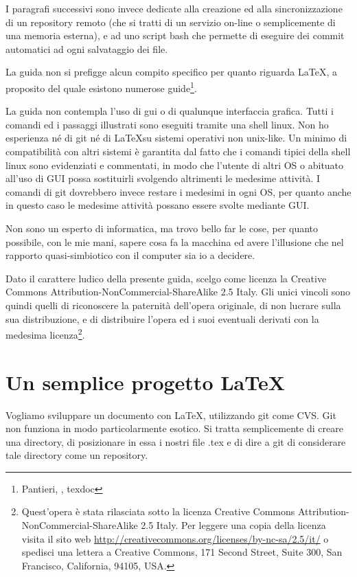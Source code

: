 \documentclass[a4paper,12pt,oneside]{article}
\begin{document}
I paragrafi successivi sono invece dedicate alla creazione ed alla
sincronizzazione di un repository remoto (che si tratti di un servizio on-line
o semplicemente di una memoria esterna), e ad uno script bash che permette di
eseguire dei commit automatici ad ogni salvataggio dei file.

La guida non si prefigge alcun compito specifico per quanto riguarda \LaTeX, a
proposito del quale esistono numerose guide\footnote{Pantieri, \guit,
texdoc}.

La guida non contempla l'uso di gui o di qualunque interfaccia grafica. Tutti i
comandi ed i passaggi illustrati sono eseguiti tramite una shell linux.
Non ho esperienza né di git né di \LaTeX su sistemi operativi non
unix-like. Un minimo di compatibilità con altri sistemi è garantita dal fatto
che i comandi tipici della shell linux sono evidenziati e commentati, in modo
che l'utente di altri OS o abituato all'uso di GUI possa sostituirli svolgendo
altrimenti le medesime attività. I comandi di git dovrebbero invece restare i
medesimi in ogni OS, per quanto anche in questo caso le medesime attività
possano essere svolte mediante GUI.

Non sono un esperto di informatica, ma trovo bello far le cose, per quanto
possibile, con le mie mani, sapere cosa fa la macchina ed avere l'illusione che
nel rapporto quasi-simbiotico con il computer sia io a decidere.

Dato il carattere ludico della presente guida, scelgo come licenza la Creative
Commons Attribution-NonCommercial-ShareAlike 2.5 Italy. Gli unici vincoli sono
quindi quelli di riconoscere la paternità dell'opera
originale, di non lucrare sulla sua distribuzione, e di distribuire l'opera ed
i suoi eventuali derivati con la medesima licenza\footnote{
Quest'opera è stata rilasciata sotto la licenza
Creative Commons Attribution-NonCommercial-ShareAlike 2.5 Italy.
Per leggere una copia della licenza visita il sito web
\url{http://creativecommons.org/licenses/by-nc-sa/2.5/it/}
o spedisci una lettera a Creative Commons, 171 Second Street, Suite 300, San
Francisco, California, 94105, USA.}.

\section{Un semplice progetto \LaTeX}
Vogliamo sviluppare un documento con \LaTeX, utilizzando git come CVS.
Git non funziona in modo particolarmente esotico. Si tratta semplicemente di
creare una directory, di posizionare in essa i nostri file .tex e di dire a git
di considerare tale directory come un repository.
\end{document}
